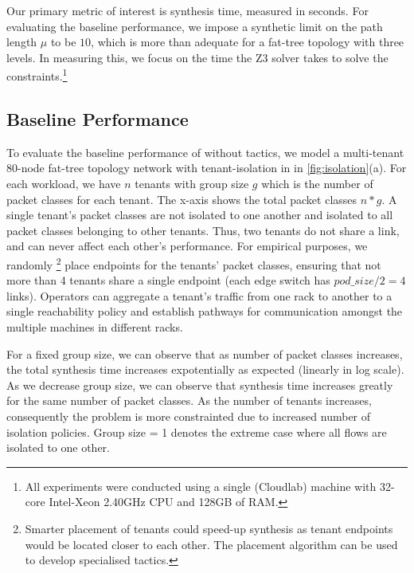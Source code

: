 Our primary metric of interest is synthesis time, measured in
seconds. For evaluating the baseline performance, we impose a
synthetic limit on the path length $\mu$ to be $10$, which is more than adequate 
for a fat-tree topology with three levels. 
In measuring this, we focus on the time the Z3 solver takes
to solve the constraints.\footnote{All experiments were conducted using a
single (Cloudlab) machine with 32-core Intel-Xeon 2.40GHz CPU and
128GB of RAM.}


\subsection{Baseline Performance}
To evaluate the baseline performance of \Name without tactics, we model a multi-tenant
80-node fat-tree topology network with   
tenant-isolation in in \cref{fig:isolation}(a). 
For each workload, we have $n$ tenants with group size $g$ which 
is the number of packet classes for each tenant. The x-axis shows the total packet classes $n*g$. 
A single tenant's packet classes are not isolated to one another and isolated to all packet
classes belonging to other tenants. Thus, two tenants do not share a link, and can never affect
each other's performance. For empirical purposes, 
we randomly
\footnote{Smarter placement of tenants could speed-up synthesis as tenant endpoints would
	be located closer to each other. The placement algorithm can be used to develop specialised tactics.}
  place endpoints for the tenants' packet classes, ensuring that not more than 4 tenants share a single endpoint
  (each edge switch has $pod\_size/2 = 4$ links). 
   Operators can aggregate a tenant's traffic from one rack to
another to a single reachability policy and establish pathways for communication amongst the multiple
machines in different racks. 

For a fixed group size, we can observe that as number of packet classes increases,
the total synthesis time increases expotentially as expected (linearly in log scale). As we decrease group size,
 we can observe that synthesis time increases greatly for the same number of packet classes.
 As the number of tenants increases, consequently the problem is more constrainted 
  due to increased number of isolation policies. 
 Group size = 1 denotes the extreme case where all flows are isolated to one other. 
      

